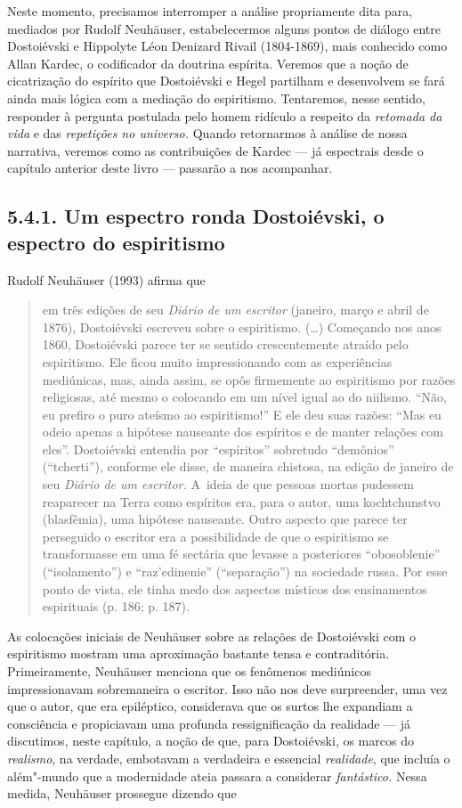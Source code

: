 Neste momento, precisamos interromper a análise propriamente dita para,
mediados por Rudolf Neuhäuser, estabelecermos alguns pontos de diálogo
entre Dostoiévski e Hippolyte Léon Denizard Rivail (1804-1869), mais
conhecido como Allan Kardec, o codificador da doutrina espírita. Veremos
que a noção de cicatrização do espírito que Dostoiévski e Hegel
partilham e desenvolvem se fará ainda mais lógica com a mediação do
espiritismo. Tentaremos, nesse sentido, responder à pergunta postulada
pelo homem ridículo a respeito da \emph{retomada da vida} e das
\emph{repetições no universo.} Quando retornarmos à análise de nossa
narrativa, veremos como as contribuições de Kardec --- já espectrais
desde o capítulo anterior deste livro --- passarão a nos acompanhar.

\subsection{5.4.1. Um espectro ronda Dostoiévski, o espectro do espiritismo}

Rudolf Neuhäuser (1993) afirma que

\begin{quote}
em três edições de seu \emph{Diário de um escritor} (janeiro, março e
abril de 1876), Dostoiévski escreveu sobre o espiritismo. (\ldots)
Começando nos anos 1860, Dostoiévski parece ter se sentido
crescentemente atraído pelo espiritismo. Ele ficou muito impressionando
com as experiências mediúnicas, mas, ainda assim, se opôs firmemente ao
espiritismo por razões religiosas, até mesmo o colocando em um nível
igual ao do niilismo. ``Não, eu prefiro o puro ateísmo ao espiritismo!''
E ele deu suas razões: ``Mas eu odeio apenas a hipótese nauseante dos
espíritos e de manter relações com eles''. Dostoiévski entendia por
``espíritos'' sobretudo ``demônios'' (``tcherti''), conforme ele disse,
de maneira chistosa, na edição de janeiro de seu \emph{Diário de um
escritor.} A~ideia de que pessoas mortas pudessem reaparecer na Terra
como espíritos era, para o autor, uma kochtchunstvo (blasfêmia), uma
hipótese nauseante. Outro aspecto que parece ter perseguido o
escritor era a possibilidade de que o espiritismo se transformasse em
uma fé sectária que levasse a posteriores ``obosoblenie''
(``isolamento'') e ``raz'edinenie'' (``separação'') na sociedade
russa. Por esse ponto de vista, ele tinha medo dos aspectos místicos dos
ensinamentos espirituais (p. 186; p. 187).
\end{quote}

As colocações iniciais de Neuhäuser sobre as relações de Dostoiévski com
o espiritismo mostram uma aproximação bastante tensa e contraditória.
Primeiramente, Neuhäuser menciona que os fenômenos mediúnicos
impressionavam sobremaneira o escritor. Isso não nos deve surpreender,
uma vez que o autor, que era epiléptico, considerava que os surtos lhe
expandiam a consciência e propiciavam uma profunda ressignificação da
realidade --- já discutimos, neste capítulo, a noção de que, para
Dostoiévski, os marcos do \emph{realismo}, na verdade, embotavam a
verdadeira e essencial \emph{realidade}, que incluía o além"-mundo que a
modernidade ateia passara a considerar \emph{fantástico.} Nessa medida,
Neuhäuser prossegue dizendo que

